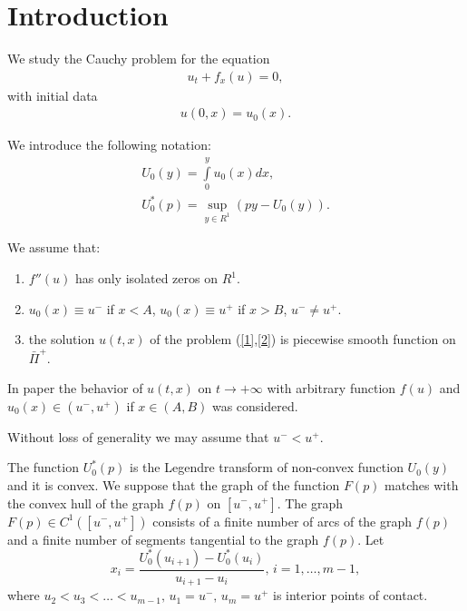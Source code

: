\documentclass[journal]{IEEEtran}
\begin{document}
\section{Introduction}
% 
% 
% 
% 
We study the Cauchy problem for the equation 
\begin{gather}\label{1}
u_t+f_x(u) = 0,
\end{gather}
with initial data
\begin{gather}\label{2}
u(0,x) = u_0(x).
\end{gather}

We introduce the following notation:
\begin{gather*}
U_0(y) = \int\limits_{0}^{y}u_0(x)dx, \\
U_0^*(p) = \sup_{y \in R^1}(py-U_0(y)).
\end{gather*}

We assume that:
\begin{enumerate}
	\item $f'' (u)$ has only isolated zeros on $R^1$.
	\item $u_0(x) \equiv u^{-}$ if $x<A$, $u_0(x) \equiv u^{+}$ if $x>B$, $u^{-}\neq u^{+}$.
	\item the solution $u(t,x)$ of the problem (\ref{1},\ref{2}) is piecewise smooth function on $\bar{\Pi}^{+}$.
\end{enumerate}

In paper \cite{petrosyan} the behavior of $u(t,x)$ on $t\rightarrow +\infty$ with arbitrary function $f(u)$ and $u_0(x)\in (u^{-},u^{+})$ if $x\in (A,B)$ was considered.

Without loss of generality we may assume that $u^{-}<u^{+}$.

The function $U_0^*(p)$ is the Legendre transform of non-convex function $U_0(y)$ and it is convex. We suppose that the graph of the function $F(p)$ matches with the convex hull of the graph  $f(p)$ on $[u^{-},u^{+}]$. The graph $F(p)\in C^1([u^{-},u^{+}])$ consists of a finite number of arcs of the graph $f(p)$ and a finite number of segments tangential to the graph $f(p)$. Let 
$$x_i = \frac{U_0^*(u_{i+1})-U_0^*(u_i)}{u_{i+1}-u_i},\, i = 1, \ldots, m-1,$$ where $u_2 < u_3< \ldots < u_{m-1},\, u_1 = u^{-},\, u_m = u^{+}$ is interior points of contact.
\end{document}

